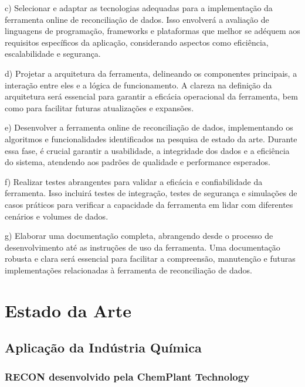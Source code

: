 c) Selecionar e adaptar as tecnologias adequadas para a implementação da ferramenta online de reconciliação de dados. Isso envolverá a avaliação de linguagens de programação, frameworks e plataformas que melhor se adéquem aos requisitos específicos da aplicação, considerando aspectos como eficiência, escalabilidade e segurança.

d) Projetar a arquitetura da ferramenta, delineando os componentes principais, a interação entre eles e a lógica de funcionamento. A clareza na definição da arquitetura será essencial para garantir a eficácia operacional da ferramenta, bem como para facilitar futuras atualizações e expansões.

e) Desenvolver a ferramenta online de reconciliação de dados, implementando os algoritmos e funcionalidades identificados na pesquisa de estado da arte. Durante essa fase, é crucial garantir a usabilidade, a integridade dos dados e a eficiência do sistema, atendendo aos padrões de qualidade e performance esperados.

f) Realizar testes abrangentes para validar a eficácia e confiabilidade da ferramenta. Isso incluirá testes de integração, testes de segurança e simulações de casos práticos para verificar a capacidade da ferramenta em lidar com diferentes cenários e volumes de dados.

g) Elaborar uma documentação completa, abrangendo desde o processo de desenvolvimento até as instruções de uso da ferramenta. Uma documentação robusta e clara será essencial para facilitar a compreensão, manutenção e futuras implementações relacionadas à ferramenta de reconciliação de dados.

\section{Estado da Arte}

\subsection{Aplicação da Indústria Química}

\subsubsection{RECON desenvolvido pela ChemPlant Technology}


